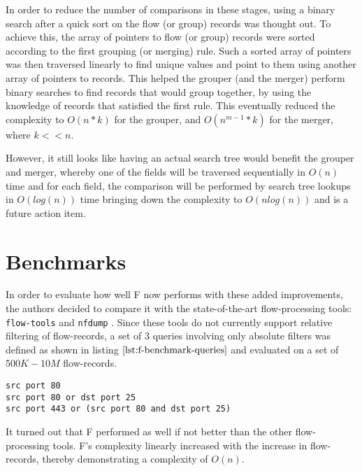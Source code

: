 In order to reduce the number of comparisons in these stages, using a binary search after a quick sort on the flow (or group) records was thought out. To achieve this, the array of pointers to flow (or group) records were sorted according to the first grouping (or merging) rule. Such a sorted array of pointers was then  traversed linearly to find unique values and point to them using another array of pointers to records. This helped the grouper (and the merger) perform binary searches to find records that would group together, by using the knowledge of records that satisfied the first rule. This eventually reduced the complexity to $O(n*k)$ for the grouper, and $O(n^{m-1} *k)$ for the merger, where $k << n$. 

However, it still looks like having an actual search tree would benefit the grouper and merger, whereby one of the fields will be traversed sequentially in $O(n)$  time and for each field, the comparison will be performed by search tree lookups in $O(log(n))$ time bringing down the complexity to $O(nlog(n))$ and is a future action item.

\section{Benchmarks}\label{sec:f-benchmarks}
In order to evaluate how well F now performs with these added improvements, the authors decided to compare it with the state-of-the-art flow-processing tools: \texttt{flow-tools} \cite{sromig:2000} and \texttt{nfdump} \cite{phaag:2006}. Since these tools do not currently support relative filtering of flow-records, a set of $3$ queries involving only absolute filters was defined as shown in listing $\ref{lst:f-benchmark-queries}$ and evaluated on a set of $500K-10M$ flow-records.  

\begin{lstlisting}
src port 80
src port 80 or dst port 25
src port 443 or (src port 80 and dst port 25)
\end{lstlisting}

It turned out that F performed as well if not better than the other flow-processing tools. F's complexity linearly increased with the increase in flow-records, thereby demonstrating a complexity of $O(n)$.